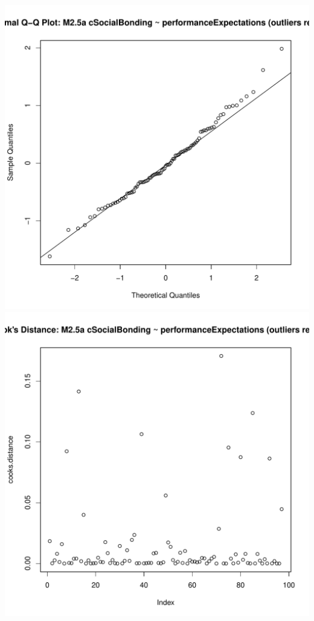 \documentclass[12pt]{report}
\begin{document}
\includegraphics[scale =.4]{../images/MLM25aOutQQNorm.pdf}
\includegraphics[scale =.4]{../images/MLM25aOutCooksD.pdf}

\newpage
\end{document}
